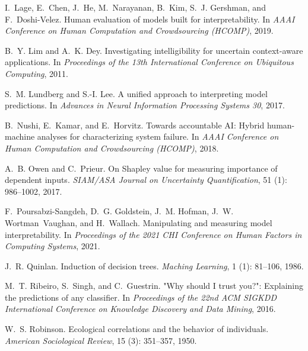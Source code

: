 \documentclass[11pt,dvipdfmx]{article}
\begin{document}
\begin{thebibliography}{10}
\begin{small}
I.~Lage, E.~Chen, J.~He, M.~Narayanan, B.~Kim, S.~J. Gershman, and
  F.~Doshi-Velez.
\newblock Human evaluation of models built for interpretability.
\newblock In \emph{AAAI Conference on Human Computation and Crowdsourcing
  (HCOMP)}, 2019.

B.~Y. Lim and A.~K. Dey.
\newblock Investigating intelligibility for uncertain context-aware
  applications.
\newblock In \emph{Proceedings of the 13th International Conference on
  Ubiquitous Computing}, 2011.

S.~M. Lundberg and S.-I. Lee.
\newblock A unified approach to interpreting model predictions.
\newblock In \emph{Advances in Neural Information Processing Systems 30}, 2017.

B.~Nushi, E.~Kamar, and E.~Horvitz.
\newblock Towards accountable {AI}: {H}ybrid human-machine analyses for
  characterizing system failure.
\newblock In \emph{AAAI Conference on Human Computation and Crowdsourcing
  (HCOMP)}, 2018.

A.~B. Owen and C.~Prieur.
\newblock On {S}hapley value for measuring importance of dependent inputs.
\newblock \emph{SIAM/ASA Journal on Uncertainty Quantification}, 51 (1): 986--1002, 2017.

F.~Poursabzi-Sangdeh, D.~G. Goldstein, J.~M. Hofman, J.~W. Wortman~Vaughan, and
  H.~Wallach.
\newblock Manipulating and measuring model interpretability.
\newblock In \emph{Proceedings of the 2021 CHI Conference on Human Factors in Computing
  Systems}, 2021.

J.~R. Quinlan.
\newblock Induction of decision trees.
\newblock \emph{Maching Learning}, 1 (1): 81--106, 1986.

M.~T. Ribeiro, S.~Singh, and C.~Guestrin.
\newblock "{W}hy should {I} trust you?": {E}xplaining the predictions of any
  classifier.
\newblock In \emph{Proceedings of the 22nd {ACM} {SIGKDD} International
  Conference on Knowledge Discovery and Data Mining}, 2016.

W.~S. Robinson.
\newblock Ecological correlations and the behavior of individuals.
\newblock \emph{American Sociological Review}, 15 (3):
  351--357, 1950.


\end{small}
\end{thebibliography}
\end{document}
